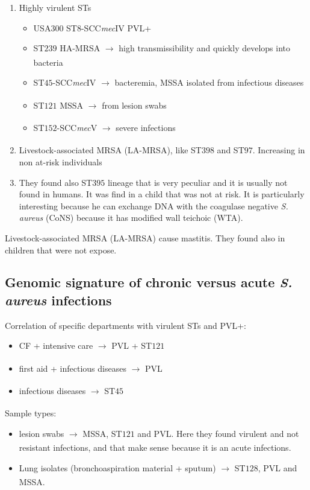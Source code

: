 \begin{enumerate}
    \item Highly virulent STs
    \begin{itemize}
        \item USA$300$ ST$8$-SCC\emph{mec}IV PVL+
        \item ST$239$ HA-MRSA $\xrightarrow[]{}$ high transmissibility and quickly develops into bacteria
        \item ST$45$-SCC\emph{mec}IV $\xrightarrow[]{}$ bacteremia, MSSA isolated from infectious diseases
        \item ST$121$ MSSA $\xrightarrow[]{}$ from lesion swabs
        \item ST$152$-SCC\emph{mec}V $\xrightarrow[]{}$ severe infections
    \end{itemize}
    \item Livestock-associated MRSA (LA-MRSA), like ST$398$ and ST$97$. Increasing in non at-risk individuals 
    \item They found also ST$395$ lineage that is very peculiar and it is usually not found in humans. It was find in a child that was not at risk. It is particularly interesting because he can exchange DNA with the coagulase negative \emph{S. aureus} (CoNS) because it has modified wall teichoic (WTA).
\end{enumerate}
Livestock-associated MRSA (LA-MRSA) cause mastitis. They found also in children that were not expose. 

\subsection{Genomic signature of chronic versus acute \emph{S. aureus} infections}

Correlation of specific departments with virulent STs and PVL+:

\begin{itemize}
    \item CF + intensive care $\xrightarrow[]{}$ PVL + ST$121$ 
    \item first aid + infectious diseases $\xrightarrow[]{}$ PVL
    \item infectious diseases $\xrightarrow[]{}$ ST$45$
\end{itemize}

Sample types: 

\begin{itemize}
    \item lesion swabs $\xrightarrow[]{}$ MSSA, ST$121$ and PVL. Here they found virulent and not resistant infections, and that make sense because it is an acute infections.
    \item Lung isolates (bronchoaspiration material + sputum) $\xrightarrow[]{}$ ST$128$, PVL and MSSA. 
\end{itemize}

